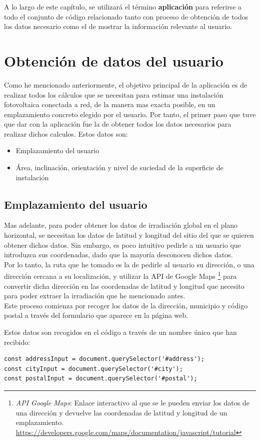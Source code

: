 \documentclass[11pt]{report}
\begin{document}
A lo largo de este capítulo, se utilizará el término \textbf{aplicación} para referirse a todo el conjunto de código relacionado tanto con proceso de obtención de todos los datos necesario como el de mostrar la información relevante al usuario.

\section{Obtención de datos del usuario}
Como he mencionado anteriormente, el objetivo principal de la aplicación es de realizar todos los cálculos que se necesitan para estimar una instalación fotovoltaica conectada a red, de la manera mas exacta posible,  en un emplazamiento concreto elegido por el usuario. Por tanto, el primer paso que tuve que dar con la aplicación fue la de obtener todos los datos necesarios para realizar dichos calculos.
Estos datos son:
\begin{itemize}
\item Emplazamiento del usuario
\item Área, inclinación, orientación y nivel de suciedad de la superficie de instalación
\end{itemize}
\subsection{Emplazamiento del usuario}
Mas adelante, para poder obtener los datos de irradiación global en el plano horizontal, se necesitan los datos de latitud y longitud del sitio del que se quieren obtener dichos datos. Sin embargo, es poco intuitivo pedirle a un usuario que introduzca sus coordenadas, dado que la mayoría desconocen dichos datos.\\
Por lo tanto, la ruta que he tomado es la de pedirle al usuario su dirección, o una dirección cercana a su localización, y utilizar la API de Google Maps \footnote{\textit{API Google Maps}: Enlace interactivo al que se le pueden enviar los datos de una dirección y devuelve las coordenadas de latitud y longitud de un emplazamiento. \url{https://developers.google.com/maps/documentation/javascript/tutorial} } para convertir dicha dirección en las coordenadas de latitud y longitud que necesito para poder extraer la irradiación que he mencionado antes.\\

Este proceso comienza por recoger los datos de la dirección, municipio y código postal a través del formulario que aparece en la página web.

Estos datos son recogidos en el código a través de un nombre único que han recibido:\\
\begin{lstlisting}[style=ES6, caption={Variables correspondientes a los tres campos}]
const addressInput = document.querySelector('#address');
const cityInput = document.querySelector('#city');
const postalInput = document.querySelector('#postal');
\end{lstlisting}
\end{document}
